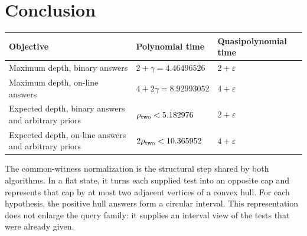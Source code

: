 \section{Conclusion}

\begin{center}
\begin{tabular}{p{}p{}p{}}
\hline
Objective & Polynomial time & Quasipolynomial time\\
\hline
Maximum depth, binary answers &
$2+\gamma=4.46496526$ & $2+\varepsilon$\\[3pt]
Maximum depth, on-line answers &
$4+2\gamma=8.92993052$ & $4+\varepsilon$\\[3pt]
Expected depth, binary answers and arbitrary priors &
$\rho_{\rm two}<5.182976$ & $2+\varepsilon$\\[3pt]
Expected depth, on-line answers and arbitrary priors &
$2\rho_{\rm two}<10.365952$ & $4+\varepsilon$\\
\hline
\end{tabular}
\end{center}

The common-witness normalization is the structural step shared by
both algorithms. In a flat state, it turns each supplied test into
an opposite cap and represents that cap by at most two adjacent
vertices of a convex hull. For each hypothesis, the positive hull
answers form a circular interval. This representation does not
enlarge the query family: it supplies an interval view of the tests
that were already given.

